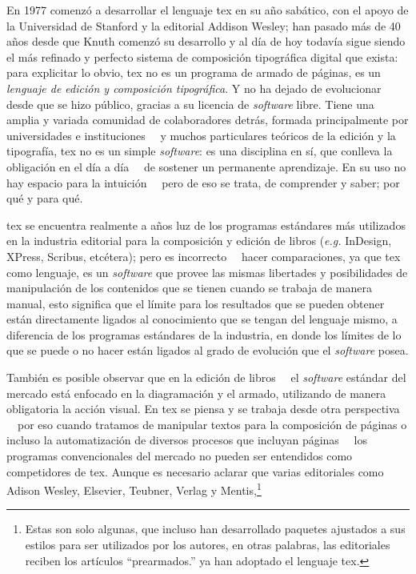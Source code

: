 \documentclass{book}
\begin{document}
{En 1977 comenzó a desarrollar el lenguaje \gls{tex} en su año sabático, con el apoyo de la Universidad de Stanford y la editorial Addison Wesley; han pasado más de 40 años desde que Knuth comenzó su desarrollo y al día de hoy todavía sigue siendo el más refinado y perfecto sistema de composición tipográfica digital que exista: para explicitar lo obvio, \gls{tex} no es un programa de armado de páginas, es un \emph{lenguaje de edición y composición tipográfica}. Y no ha dejado de evolucionar desde que se hizo público, gracias a su licencia de \emph{software} libre. Tiene una amplia y variada comunidad de colaboradores detrás, formada principalmente por universidades e instituciones \ \rdash \ y muchos particulares teóricos de la edición y la tipografía, \gls{tex} no es un simple \emph{software}: es una disciplina en sí, que conlleva la obligación en el día a día \ \rdash \ de sostener un permanente aprendizaje. En su uso no hay espacio para la intuición \ \rdash \ pero de eso se trata, de comprender y saber; por qué y para qué.

\gls{tex} se encuentra realmente a años luz de los programas estándares más utilizados en la industria editorial para la composición y edición de libros (\emph{e.g.} InDesign, XPress, Scribus, etcétera); pero es incorrecto \ \rdash \ hacer comparaciones, ya que \gls{tex} como lenguaje, es un \emph{software} que provee las mismas libertades y posibilidades de manipulación de los contenidos que se tienen cuando se trabaja de manera manual, esto significa que el límite para los resultados que se pueden obtener están directamente ligados al conocimiento que se tengan del lenguaje mismo, a diferencia de los programas estándares de la industria, en donde los límites de lo que se puede o no hacer están ligados al grado de evolución que el \emph{software} posea.

También es posible observar que en la edición de libros \ \rdash \ el \emph{software} estándar del mercado está enfocado en la diagramación y el armado, utilizando de manera obligatoria la acción visual. En \gls{tex} se piensa y se trabaja desde otra perspectiva \ \rdash \ por eso cuando tratamos de manipular textos para la composición de páginas o incluso la automatización de diversos procesos que incluyan páginas \ \rdash \ los programas convencionales del mercado no pueden ser entendidos como competidores de \gls{tex}. Aunque es necesario aclarar que varias editoriales como Adison Wesley, Elsevier, Teub­ner, Ver­lag y Mentis,\footnote{Estas son solo algunas, que incluso han desarrollado paquetes ajustados a sus estilos para ser utilizados por los autores, en otras palabras, las editoriales reciben los artículos \enquote{{prearmados}.} ya han adoptado el lenguaje \gls{tex}.

}}
\end{document}
